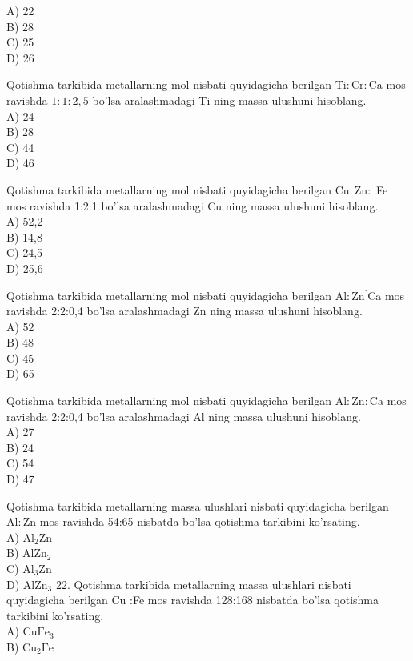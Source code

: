 A) 22\\
B) 28\\
C) 25\\
D) 26
  \item Qotishma tarkibida metallarning mol nisbati quyidagicha berilgan $\mathrm{Ti}: \mathrm{Cr}: \mathrm{Ca}$ mos ravishda $1: 1: 2,5$ bo'lsa aralashmadagi Ti ning massa ulushuni hisoblang.\\
A) 24\\
B) 28\\
C) 44\\
D) 46
  \item Qotishma tarkibida metallarning mol nisbati quyidagicha berilgan $\mathrm{Cu}: \mathrm{Zn}:$ Fe mos ravishda 1:2:1 bo'lsa aralashmadagi Cu ning massa ulushuni hisoblang.\\
A) 52,2\\
B) 14,8\\
C) 24,5\\
D) 25,6
  \item Qotishma tarkibida metallarning mol nisbati quyidagicha berilgan $\mathrm{Al}: \mathrm{Zn}^{:} \mathrm{Ca}$ mos ravishda 2:2:0,4 bo'lsa aralashmadagi Zn ning massa ulushuni hisoblang.\\
A) 52\\
B) 48\\
C) 45\\
D) 65
  \item Qotishma tarkibida metallarning mol nisbati quyidagicha berilgan $\mathrm{Al}: \mathrm{Zn}: \mathrm{Ca}$ mos ravishda 2:2:0,4 bo'lsa aralashmadagi Al ning massa ulushuni hisoblang.\\
A) 27\\
B) 24\\
C) 54\\
D) 47
  \item Qotishma tarkibida metallarning massa ulushlari nisbati quyidagicha berilgan $\mathrm{Al}: \mathrm{Zn}$ mos ravishda 54:65 nisbatda bo'lsa qotishma tarkibini ko'rsating.\\
A) $\mathrm{Al}_{2} \mathrm{Zn}$\\
B) $\mathrm{AlZn}_{2}$\\
C) $\mathrm{Al}_{3} \mathrm{Zn}$\\
D) $\mathrm{AlZn}_{3}$
22. Qotishma tarkibida metallarning massa ulushlari nisbati quyidagicha berilgan Cu :Fe mos ravishda 128:168 nisbatda bo'lsa qotishma tarkibini ko'rsating.\\
A) $\mathrm{CuFe}_{3}$\\
B) $\mathrm{Cu}_{2} \mathrm{Fe}$\\
